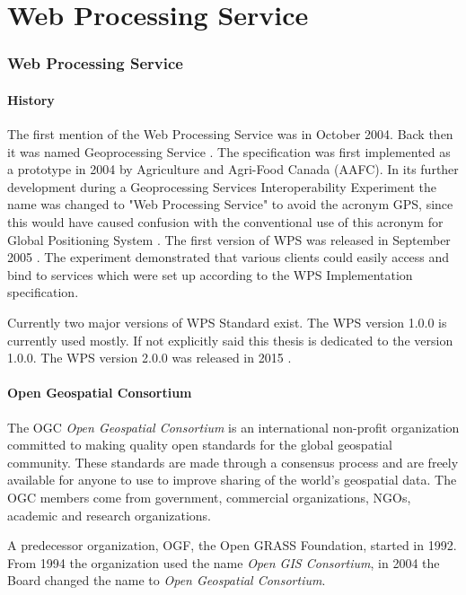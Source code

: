 \newpage
\part{Web Processing Service}
\newpage
\section{Web Processing Service}

\subsection{History}
The first mention of the Web Processing Service was in October 2004. Back then it
was named Geoprocessing Service \cite{OGC_news}. The specification was first 
implemented as a prototype in 2004 by Agriculture and Agri-Food Canada (AAFC).
In its further development during a Geoprocessing Services Interoperability Experiment \cite{WPS_experiment} 
the name was changed to "Web Processing Service" to avoid the acronym GPS, since 
this would have caused confusion with the conventional use of this acronym for 
Global Positioning System \cite{WPS_standart_1.0}. The first version of WPS was released in
September 2005 \cite{WPS_first}. The experiment demonstrated that various clients
could easily access and bind to services which were set up according to the WPS Implementation
specification.

Currently two major versions of WPS Standard exist. The WPS version 1.0.0 is currently used mostly.
If not explicitly said this thesis is dedicated to the version 1.0.0. The WPS version 2.0.0 was
released in 2015 \cite{WPS_second}.

\subsection{Open Geospatial Consortium}
The OGC \textit{Open Geospatial Consortium} is an international non-profit organization committed to making quality 
open standards for the global geospatial community. These standards are made through a consensus process and are freely available for anyone to use to improve sharing of the world's geospatial data. The OGC members come from government, commercial organizations, NGOs, academic and research organizations.\cite{OGC}

A predecessor organization, OGF, the Open GRASS Foundation, started in 1992. From 1994 the organization 
used the name \textit{Open GIS Consortium}, in 2004 the Board changed the name to \textit{Open Geospatial Consortium}.\cite{OGC_history}

